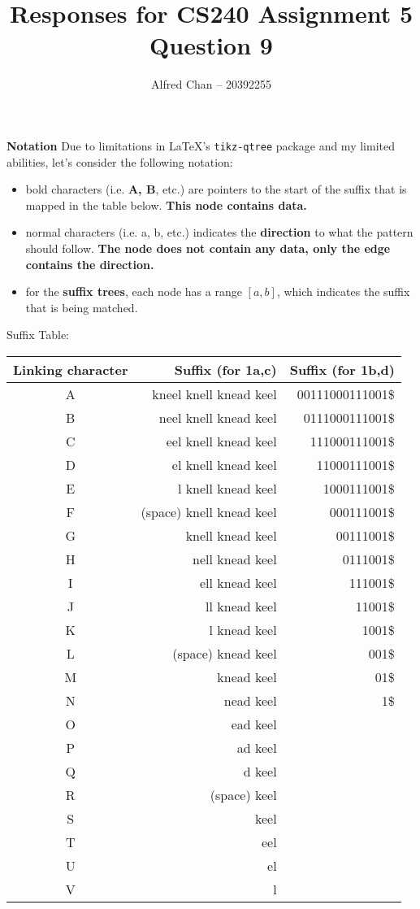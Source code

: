 \documentclass[12pt]{article}
\title{Responses for CS240 Assignment 5 Question 9}
\author{Alfred Chan -- 20392255}
\begin{document}
\maketitle

{\bf Notation} Due to limitations in \LaTeX's \texttt{tikz-qtree} package and my limited abilities, let's consider the following notation:
\begin{itemize}
\item bold characters (i.e. {\bf A, B}, etc.) are pointers to the start of the suffix that is mapped in the table below. {\bf This node contains data.}
\item normal characters (i.e. a, b, etc.) indicates the {\bf direction} to what the pattern should follow. {\bf The node does not contain any data, only the edge contains the direction.}
\item for the {\bf suffix trees}, each node has a range $[a,b]$, which indicates the suffix that is being matched.
\end{itemize}

Suffix Table:\\
\begin{tabular}{c|r|r}
Linking character & Suffix (for 1a,c) & Suffix (for 1b,d)\\\hline
A & kneel knell knead keel		& 00111000111001\$\\\hline
B & neel knell knead keel			& 0111000111001\$\\\hline
C & eel knell knead keel			& 111000111001\$\\\hline
D & el knell knead keel				& 11000111001\$\\\hline
E & l knell knead keel				& 1000111001\$\\\hline
F & (space) knell knead keel	& 000111001\$\\\hline
G & knell knead keel					& 00111001\$\\\hline
H & nell knead keel						& 0111001\$\\\hline
I & ell knead keel						& 111001\$\\\hline
J & ll knead keel							& 11001\$\\\hline
K & l knead keel							& 1001\$\\\hline
L & (space) knead keel				& 001\$\\\hline
M & knead keel								& 01\$\\\hline
N & nead keel									& 1\$\\\hline
O & ead keel\\\hline
P & ad keel\\\hline
Q & d keel\\\hline
R & (space) keel\\\hline
S & keel\\\hline
T & eel\\\hline
U & el\\\hline
V & l\\\hline
\end{tabular}\\
\end{document}
